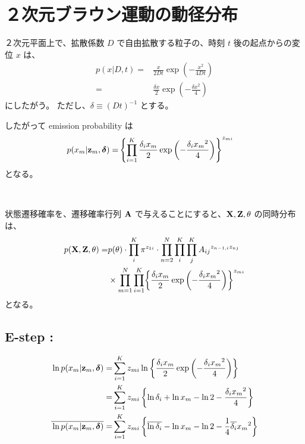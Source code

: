 
\section{ ２次元ブラウン運動の動径分布 }

２次元平面上で、拡散係数 $D$ で自由拡散する粒子の、時刻 $t$ 後の起点からの変位 $x$ は、
\begin{align}
  p(x|D, t)  =&  \frac{x}{2 D t} \exp\left( - \frac{x^2}{4 D t} \right)  \\
%
  =&  \frac{\delta x}{2} \exp\left( - \frac{\delta x^2}{4}  \right)  
\end{align}
にしたがう。
ただし、$\delta \equiv (D t)^{-1}$ とする。

したがって emission probability は
\begin{align}
  p(x_m|{\bf z}_m, {\boldsymbol \delta})  =&  \left\{ \prod_{i=1}^K  \frac{\delta_i x_m}{2} \exp\left( - \frac{\delta_i {x_m}^2}{4}  \right) \right\}^{z_{mi}}  \label{eqn:gaussDiff_pXnZn}  
\end{align}
となる。

\

状態遷移確率を、遷移確率行列 ${\bf A}$ で与えることにすると、${\bf X}, {\bf Z}, \theta$ の同時分布は、
\begin{align}
  p( {\bf X}, {\bf Z}, \theta )  =&  p( \theta ) \cdot \prod_i^K \pi^{z_{1i}} 
    \cdot \prod_{n=2}^N \prod_i^K \prod_{j}^K {A_{ij}}^{ z_{n-1, i} z_{nj} }  \notag  \\  
    &  \times \prod_{m=1}^N \prod_{i=1}^K  \biggl\{ \frac{\delta_i x_m}{2} \exp\left( - \frac{\delta_i {x_m}^2}{4} \right) \biggr\}^{z_{mi}}  \label{eqn:gaussDiff_jointDistVbHmmPc}
\end{align}
となる。


\subsection{ E-step :}
\begin{align}
  \ln {p}( x_m | {\bf z}_m, {\boldsymbol \delta} )  =&  \sum_{i=1}^K z_{mi} \ln \left\{  \frac{\delta_i x_m}{2} \exp\left( - \frac{\delta_i {x_m}^2}{4} \right)  \right\}  \\  
%
  =&  \sum_{i=1}^K z_{mi} \left\{ \ln \delta_i + \ln x_m - \ln 2 - \frac{ \delta_i {x_m}^2 }{ 4 } \right\}  \\  
%
  \overline{\mathstrut \ln {p}( x_m | {\bf z}_m, {\boldsymbol \delta} )} =&  \sum_{i=1}^K z_{mi} \left\{ \overline{\ln \delta_i} - \ln x_m - \ln 2 - \frac{1}{4} \overline{\delta_i} {x_m}^2 \right\}
\end{align}


